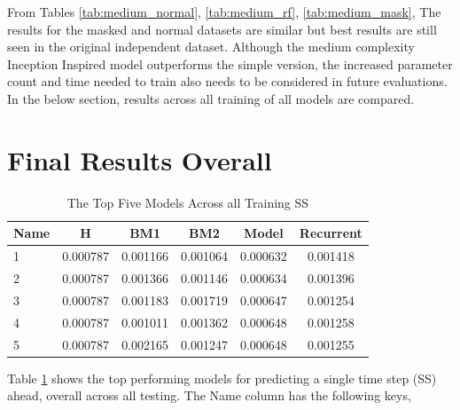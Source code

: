 From Tables \ref{tab:medium_normal}, \ref{tab:medium_rf}, \ref{tab:medium_mask}, The results for the masked and normal datasets are similar but best results are still seen in the original independent dataset. Although the medium complexity Inception Inspired model outperforms the simple version, the increased parameter count and time needed to train also needs to be considered in future evaluations. In the below section, results across all training of all models are compared. \\

\section{Final Results Overall}
\begin{table}[htbp]
	\centering
	\caption{The Top Five Models Across all Training SS}
	\label{tab:best_ss}
	\begin{tabular}{p{2cm}ccccc}
		\toprule
		Name &  H &  BM1 &  BM2 &  Model &  Recurrent \\
		\midrule
		1 &       0.000787 &        0.001166 &        0.001064 &   0.000632 &            0.001418 \\
		2 &       0.000787 &        0.001366 &        0.001146 &   0.000634 &            0.001396 \\
		3 &       0.000787 &        0.001183 &        0.001719 &   0.000647 &            0.001254 \\
		4 &       0.000787 &        0.001011 &        0.001362 &   0.000648 &            0.001258 \\
		5 &       0.000787 &        0.002165 &        0.001247 &   0.000648 &            0.001255 \\
		\bottomrule
	\end{tabular}
\end{table}
Table \ref{tab:best_ss} shows the top performing models for predicting a single time step (SS) ahead, overall across all testing. The Name column has the following keys,
